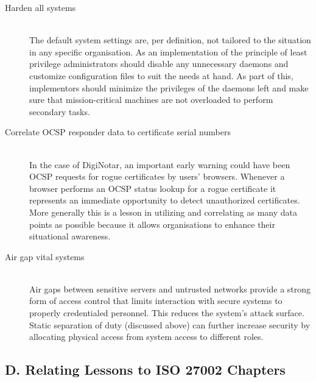 \documentclass[a4paper]{llncs}
\begin{document}
\begin{description}
  \item[Harden all systems] \hfill \\
The default system settings are, per definition, not tailored to the situation in any specific organisation. As an implementation of the principle of least privilege administrators should disable any unnecessary daemons and customize configuration files to suit the needs at hand. As part of this, implementors should minimize the privileges of the daemons left and make sure that mission-critical machines are not overloaded to perform secondary tasks.
  \item[Correlate OCSP responder data to certificate serial numbers] \hfill \\
In the case of DigiNotar, an important early warning could have been OCSP requests for rogue certificates by users’ browsers. Whenever a browser performs an OCSP status lookup for a rogue certificate it represents an immediate opportunity to detect unauthorized certificates. More generally this is a lesson in utilizing and correlating as many data points as possible because it allows organisations to enhance their situational awareness.
  \item[Air gap vital systems] \hfill \\
Air gaps between sensitive servers and untrusted networks provide a strong form of access control that limits interaction with secure systems to properly credentialed personnel. This reduces the system’s attack surface. Static separation of duty (discussed above) can further increase security by allocating physical access from system access to different roles.
\end{description}

\subsection{D. Relating Lessons to ISO 27002 Chapters}
\end{document}
